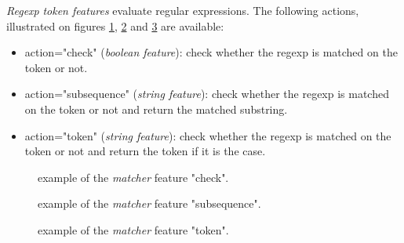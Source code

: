 \documentclass[manual-fr.tex]{subfiles}
\begin{document}
\emph{Regexp} \textit{token features} evaluate regular expressions. The following actions, illustrated on figures \ref{fig:feature-matcher-check}, \ref{fig:feature-matcher-subsequence} and \ref{fig:feature-matcher-token} are available:
\begin{itemize}
    \item action="check" (\textit{boolean feature}): check whether the regexp is matched on the token or not.
    \item action="subsequence" (\textit{string feature}): check whether the regexp is matched on the token or not and return the matched substring.
    \item action="token" (\textit{string feature}): check whether the regexp is matched on the token or not and return the token if it is the case.
\end{itemize}

\begin{figure}[ht!]
\footnotesize
\begin{xml}
\end{xml}
\caption{example of the \textit{matcher} feature "check".}
\label{fig:feature-matcher-check}
\end{figure}

\begin{figure}[ht!]
\footnotesize
\begin{xml}
\end{xml}
\caption{example of the \textit{matcher} feature "subsequence".}
\label{fig:feature-matcher-subsequence}
\end{figure}

\begin{figure}[ht!]
\footnotesize
\begin{xml}
\end{xml}
\caption{example of the \textit{matcher} feature "token".}
\label{fig:feature-matcher-token}
\end{figure}
\end{document}
